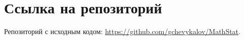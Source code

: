 \section{Ссылка на репозиторий}
\begin{flushleft}
	Репозиторий с исходным кодом: \url{https://github.com/gchevykalov/MathStat}.
\end{flushleft}